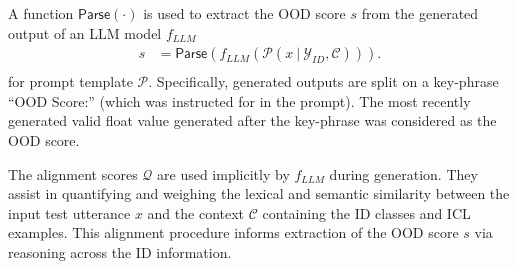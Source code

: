 A function $\mathsf{Parse}(\cdot)$ is used to extract the OOD score $s$ from the generated output of an LLM model $f_{LLM}$
\begin{equation}
\begin{split}
	s & = \mathsf{Parse}(f_{LLM}(\mathcal{P}(x\ |\ \mathcal{Y}_{ID},\mathcal{C}))). \\
\end{split}
\end{equation}
for prompt template $\mathcal{P}$. Specifically, generated outputs are split on a key-phrase ``OOD Score:'' (which was instructed for in the prompt). The most recently generated valid float value generated after the key-phrase was considered as the OOD score.

The alignment scores $\mathcal{Q}$ are used implicitly by $f_{LLM}$ during generation. They assist in quantifying and weighing the lexical and semantic similarity between the input test utterance $x$ and the context $\mathcal{C}$ containing the ID classes and ICL examples. This alignment procedure informs extraction of the OOD score $s$ via reasoning across the ID information.

